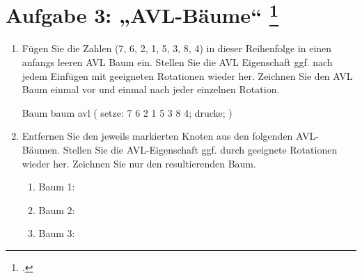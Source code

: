 \documentclass{lehramt-informatik-aufgabe}
\begin{document}
\liAufgabenTitel{}
\section{Aufgabe 3: „AVL-Bäume“
\footcite{66115:2014:03}}

\begin{enumerate}


\item Fügen Sie die Zahlen (7, 6, 2, 1, 5, 3, 8, 4) in dieser
Reihenfolge in einen anfangs leeren AVL Baum ein. Stellen Sie die AVL
Eigenschaft ggf. nach jedem Einfügen mit geeigneten Rotationen wieder
her. Zeichnen Sie den AVL Baum einmal vor und einmal nach jeder
einzelnen Rotation.

\begin{liProjektSprache}{Baum}
baum avl (
  setze: 7 6 2 1 5 3 8 4;
  drucke;
)
\end{liProjektSprache}



\item Entfernen Sie den jeweils markierten Knoten aus den folgenden
AVL-Bäumen. Stellen Sie die AVL-Eigenschaft ggf. durch geeignete
Rotationen wieder her. Zeichnen Sie nur den resultierenden Baum.

\begin{enumerate}


\item Baum 1:


\item Baum 2:


\item Baum 3:
\end{enumerate}
\end{enumerate}
\end{document}
